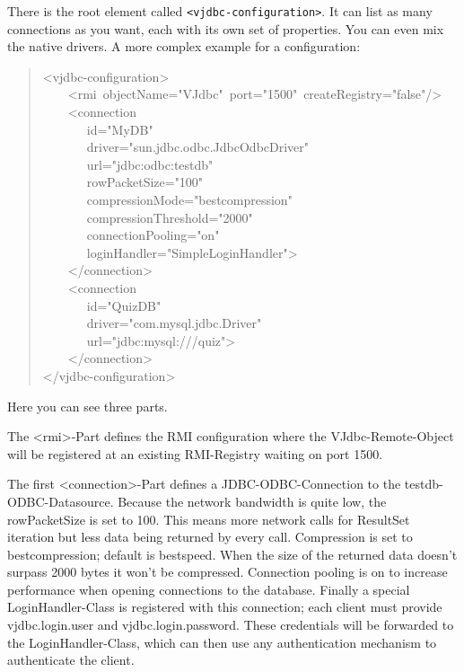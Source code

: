 \documentclass[10pt,a4paper,english]{article}
\begin{document}
There is the root element called \texttt{<vjdbc-configuration>}. It can list as many connections as you want, each with its own set of properties. You can even mix the native drivers. A more complex example for a configuration:
\begin{quote}{\ttfamily \raggedright \noindent
<vjdbc-configuration>~\\
~~~~<rmi~objectName="VJdbc"~port="1500"~createRegistry="false"/>~\\
~~~~<connection~\\
~~~~~~~id="MyDB"~\\
~~~~~~~driver="sun.jdbc.odbc.JdbcOdbcDriver"~\\
~~~~~~~url="jdbc:odbc:testdb"~\\
~~~~~~~rowPacketSize="100"~\\
~~~~~~~compressionMode="bestcompression"~\\
~~~~~~~compressionThreshold="2000"~\\
~~~~~~~connectionPooling="on"~\\
~~~~~~~loginHandler="SimpleLoginHandler">~\\
~~~~</connection>~\\
~~~~<connection~\\
~~~~~~~id="QuizDB"~\\
~~~~~~~driver="com.mysql.jdbc.Driver"~\\
~~~~~~~url="jdbc:mysql:///quiz">~\\
~~~~</connection>~\\
</vjdbc-configuration>
}\end{quote}

Here you can see three parts.

The {\textless}rmi{\textgreater}-Part defines the RMI configuration where the VJdbc-Remote-Object will be registered at an existing RMI-Registry waiting on port 1500.

The first {\textless}connection{\textgreater}-Part defines a JDBC-ODBC-Connection to the testdb-ODBC-Datasource. Because the network bandwidth is quite low, the rowPacketSize is set to 100. This means more network calls for ResultSet iteration but less data being returned by every call. Compression is set to bestcompression; default is bestspeed. When the size of the returned data doesn't surpass 2000 bytes it won't be compressed. Connection pooling is on to increase performance when opening connections to the database. Finally a special LoginHandler-Class is registered with this connection; each client must provide vjdbc.login.user and vjdbc.login.password. These credentials will be forwarded to the LoginHandler-Class, which can then use any authentication mechanism to authenticate the client.
\end{document}
